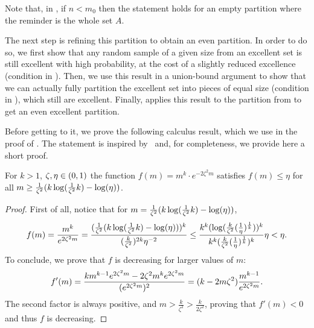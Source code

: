         Note that, in ,
        if $n < m_0$ then the statement holds for an empty partition where the reminder is the whole set $A$.

        The next step is refining this partition to obtain an even partition.
        In order to do so, we first show that any random sample of a given size from an excellent set is still excellent
        with high probability, at the cost of a slightly reduced excellence (condition
         in
        ).
        Then, we use this result in a union-bound argument to show that we can actually fully partition the excellent set into
        pieces of equal size (condition  in
        ), which still are excellent.
        Finally,  applies this result to the partition from
         to get an even excellent partition.

        Before getting to it, we prove the following calculus result, which we use in the proof of .
        The statement is inspired by~\cite[page 272]{on_the_uniform_convergence_of_relative_frequencies_of_events_to_their_probabilities}
        and, for completeness, we provide here a short proof.

        \begin{claim} \label{clm:ineq_5.13}
            For $k > 1$, $\zeta, \eta \in ( 0,1 )$ the function $f(m) = m^k \cdot e^{-2 \zeta^2 m}$ satisfies
            $f(m) \leq \eta$ for all $m \geq \frac{1}{\zeta^2}( k \log( \frac{1}{\zeta^2} k ) - \log( \eta ) )$.
            \begin{proof}
                First of all, notice that for $m = \frac{1}{\zeta^2}( k \log( \frac{1}{\zeta^2} k ) - \log( \eta ) )$,
                \[
                    f(m) = \frac{m^k}{e^{2 \zeta^2 m}}
                         = \frac{( \frac{1}{\zeta^2}( k \log( \frac{1}{\zeta^2} k ) - \log( \eta ) ) )^k}{
                            ( \frac{k}{\zeta^2} )^{2k} \eta^{-2}}
                         \leq \frac{k^k ( \log( \frac{k}{\zeta^2}( \frac{1}{\eta} )^{\frac{1}{k}} ) )^k}
                            {k^k ( \frac{k}{\zeta^2} ( \frac{1}{\eta} )^{\frac{1}{k}} )^k} \eta
                         < \eta.
                \]
                To conclude, we prove that $f$ is decreasing for larger values of $m$:
                \[
                    f'(m)
                        = \frac{k m^{k-1} e^{2 \zeta^2 m} - 2 \zeta^2 m^k e^{2 \zeta^2 m}}{( e^{2 \zeta^2 m} )^2}
                        = ( k - 2m\zeta^2 ) \frac{m^{k-1}}{e^{2 \zeta^2 m}}.
                \]
                The second factor is always positive, and $m > \frac{k}{\zeta^2} > \frac{k}{2\zeta^2}$, proving that $f'(m) < 0$
                and thus $f$ is decreasing.
            \end{proof}
        \end{claim}

